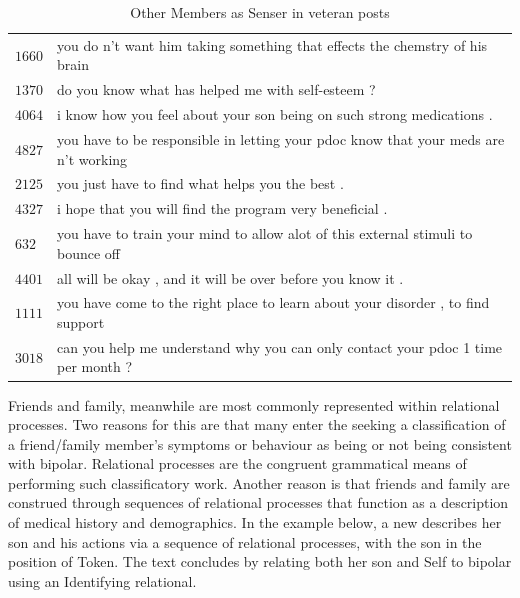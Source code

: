 \begin{table}[htb]
  \centering
  \small
  \begin{tabular}{ll}
  
  \toprule
  $1660$ &  you do n't want him taking something that effects the chemstry of his brain  \\
  $1370$ &  do you know what has helped me with self-esteem ?                                                \\
  $4064$ &  i know how you feel about your son being on such strong medications .                            \\
  $4827$ &  you have to be responsible in letting your pdoc know that your meds are n't working  \\
  $2125$ &  you just have to find what helps you the best .                                                  \\
  $4327$ &  i hope that you will find the program very beneficial .                                          \\
  $632 $ &  you have to train your mind to allow alot of this external stimuli to bounce off  \\
  $4401$ &  all will be okay , and it will be over before you know it .                                      \\
  $1111$ &  you have come to the right place to learn about your disorder , to find support  \\
  $3018$ &  can you help me understand why you can only contact your pdoc 1 time per month ?                 \\
  \bottomrule
  \end{tabular}
  \caption{Other Members as Senser in veteran posts}
  \label{conc:others-in-mental}
  \end{table}

Friends and family, meanwhile are most commonly represented within relational processes. Two reasons for this are that many  enter the  seeking a classification of a friend\slash family member's symptoms or behaviour as being or not being consistent with \gls{bipolar}. Relational processes are the congruent grammatical means of performing such classificatory work. Another reason is that friends and family are construed through sequences of relational processes that function as a description of medical history and demographics. In the example below, a new  describes her son and his actions via a sequence of relational processes, with the son in the position of Token. The text concludes by relating both her son and Self to \Gls{bipolar} using an Identifying relational.

